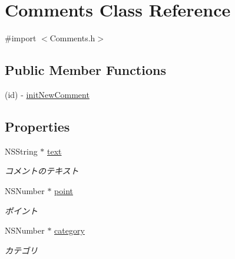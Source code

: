 \hypertarget{interface_comments}{
\section{Comments Class Reference}
\label{interface_comments}
}


{\ttfamily \#import $<$Comments.h$>$}

\subsection*{Public Member Functions}
\begin{DoxyCompactItemize}
\item 
(id) -\/ \hyperlink{interface_comments_a25786b2cc2e363a9fe58e36ca8fbc50c}{initNewComment}
\end{DoxyCompactItemize}
\subsection*{Properties}
\begin{DoxyCompactItemize}
\item 
\hypertarget{interface_comments_aa8826e1d0c33addc49356e37eff0f1d2}{
NSString $\ast$ \hyperlink{interface_comments_aa8826e1d0c33addc49356e37eff0f1d2}{text}}
\label{interface_comments_aa8826e1d0c33addc49356e37eff0f1d2}

\begin{DoxyCompactList}\small\item\em コメントのテキスト \end{DoxyCompactList}\item 
\hypertarget{interface_comments_a791451d841ae6eb605b00d86fff418a2}{
NSNumber $\ast$ \hyperlink{interface_comments_a791451d841ae6eb605b00d86fff418a2}{point}}
\label{interface_comments_a791451d841ae6eb605b00d86fff418a2}

\begin{DoxyCompactList}\small\item\em ポイント \end{DoxyCompactList}\item 
\hypertarget{interface_comments_a1d5c475bf3aab8b33eea6c2eb6e0e10c}{
NSNumber $\ast$ \hyperlink{interface_comments_a1d5c475bf3aab8b33eea6c2eb6e0e10c}{category}}
\label{interface_comments_a1d5c475bf3aab8b33eea6c2eb6e0e10c}

\begin{DoxyCompactList}\small\item\em カテゴリ \end{DoxyCompactList}\end{DoxyCompactItemize}


